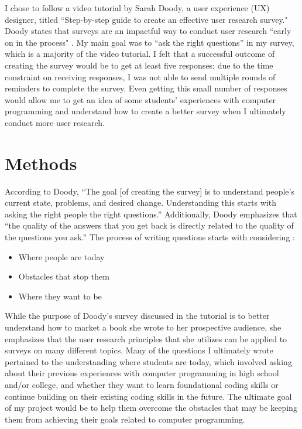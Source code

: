\documentclass[10pt,twocolumn]{article}
\begin{document}
I chose to follow a video tutorial by Sarah Doody, a user experience (UX) designer, titled “Step-by-step guide to create an effective user research survey." Doody states that surveys are an impactful way to conduct user research “early on in the process" \cite{Tutorial}. My main goal was to “ask the right questions” in my survey, which is a majority of the video tutorial. I felt that a successful outcome of creating the survey would be to get at least five responses; due to the time constraint on receiving responses, I was not able to send multiple rounds of reminders to complete the survey. Even getting this small number of responses would allow me to get an idea of some students’ experiences with computer programming and understand how to create a better survey when I ultimately conduct more user research.


\section{Methods}

According to Doody, “The goal [of creating the survey] is to understand people’s current state, problems, and desired change. Understanding this starts with asking the right people the right questions.” Additionally, Doody emphasizes that “the quality of the answers that you get back is directly related to the quality of the questions you ask.” The process of writing questions starts with considering \cite{Tutorial}:
\begin{itemize}
    \item{Where people are today}
    \item{Obstacles that stop them}
    \item{Where they want to be}
\end{itemize}
While the purpose of Doody’s survey discussed in the tutorial is to better understand how to market a book she wrote to her prospective audience, she emphasizes that the user research principles that she utilizes can be applied to surveys on many different topics. Many of the questions I ultimately wrote pertained to the understanding where students are today, which involved asking about their previous experiences with computer programming in high school and/or college, and whether they want to learn foundational coding skills or continue building on their existing coding skills in the future. The ultimate goal of my project would be to help them overcome the obstacles that may be keeping them from achieving their goals related to computer programming.  
 
\end{document}
